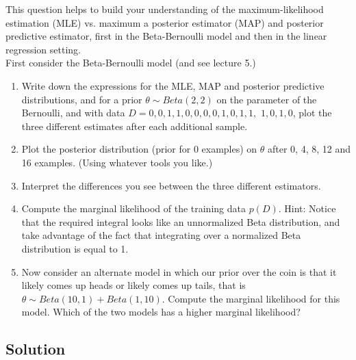 \documentclass[submit]{harvardml}
\begin{document}
\newpage
\begin{problem}

  This question helps to build your understanding of the
  maximum-likelihood estimation (MLE) vs. maximum a posterior
  estimator (MAP) and posterior predictive estimator, first in the
  Beta-Bernoulli model and then in the linear regression setting.\\

First consider the Beta-Bernoulli model (and see lecture 5.)
%
\begin{enumerate}
\item Write down the expressions for the MLE, MAP and posterior predictive
distributions, and for
a prior $\theta\sim Beta(2,2)$ on the
parameter of the Bernoulli,
and  with data $D= 0, 0, 1, 1, 0, 0, 0, 0, 1, 0, 1, 1,$
$1, 0, 1, 0$, plot
the three different
estimates after each additional
sample.
%
\item Plot the posterior distribution (prior for 0 examples) on $\theta$ after 0, 4, 8, 12 and 16
examples. (Using whatever tools you like.)
%
\item Interpret the differences you see between the three different
estimators.
%

\item Compute the marginal likelihood of the training data $p(D)$.
  Hint: Notice that the required integral looks like an unnormalized
  Beta distribution, and take advantage of the fact that integrating
  over a normalized Beta distribution is equal to 1.
\item Now consider an alternate model in which our prior over the coin
  is that it likely comes up heads or likely comes up tails, that is
  $\theta \sim Beta(10,1) + Beta(1,10)$.  Compute the marginal
  likelihood for this model.  Which of the two models has a higher
  marginal likelihood?

\end{enumerate}

 \end{problem}

\subsection*{Solution}


\end{document}
